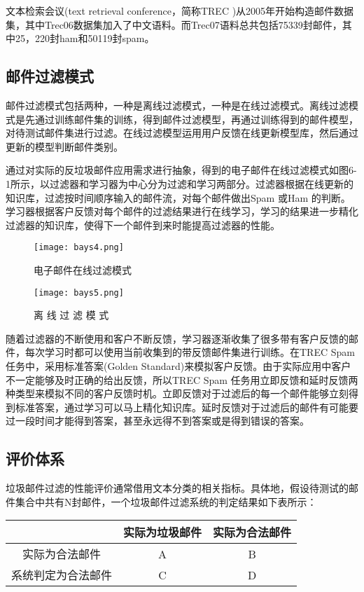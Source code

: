 文本检索会议(text  retrieval conference，简称TREC )从2005年开始构造邮件数据集，其中Trec06数据集加入了中文语料。而Trec07语料总共包括75339封邮件，其中25，220封ham和50119封spam。
\subsection{邮件过滤模式}
邮件过滤模式包括两种，一种是离线过滤模式，一种是在线过滤模式。离线过滤模式是先通过训练邮件集的训练，得到邮件过滤模型，再通过训练得到的邮件模型，对待测试邮件集进行过滤。在线过滤模型运用用户反馈在线更新模型库，然后通过更新的模型判断邮件类别。

 通过对实际的反垃圾邮件应用需求进行抽象，得到的电子邮件在线过滤模式如图6-1所示，以过滤器和学习器为中心分为过滤和学习两部分。过滤器根据在线更新的知识库，过滤按时间顺序输入的邮件流，对每个邮件做出Spam 或Ham 的判断。学习器根据客户反馈对每个邮件的过滤结果进行在线学习，学习的结果进一步精化过滤器的知识库，使得下一个邮件到来时能提高过滤器的性能。
\begin{figure}[htbp]
\centering
\texttt{[image: bays4.png]}
\caption{电子邮件在线过滤模式}
\texttt{[image: bays5.png]}
\caption{离 线 过 滤 模 式}
\label{fig:logo}
\end{figure}
随着过滤器的不断使用和客户不断反馈，学习器逐渐收集了很多带有客户反馈的邮件，每次学习时都可以使用当前收集到的带反馈邮件集进行训练。在TREC Spam 任务中，采用标准答案(Golden Standard)来模拟客户反馈。由于实际应用中客户不一定能够及时正确的给出反馈，所以TREC Spam 任务用立即反馈和延时反馈两种类型来模拟不同的客户反馈时机。立即反馈对于过滤后的每一个邮件能够立刻得到标准答案，通过学习可以马上精化知识库。延时反馈对于过滤后的邮件有可能要过一段时间才能得到答案，甚至永远得不到答案或是得到错误的答案。
\subsection{评价体系}
垃圾邮件过滤的性能评价通常借用文本分类的相关指标。具体地，假设待测试的邮件集合中共有N封邮件，一个垃圾邮件过滤系统的判定结果如下表所示：
\begin{table}[!htbp]
\centering
\begin{tabular}{|c|c|c|}%
\hline  %
&实际为垃圾邮件&实际为合法邮件\\
\hline  %
实际为合法邮件&A&B\\
\hline %
系统判定为合法邮件&C&D\\
\hline %
\end{tabular}
\end{table}

